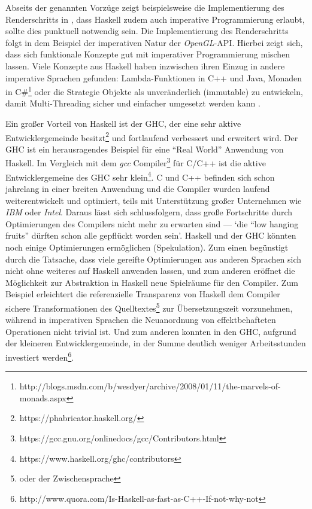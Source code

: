 Abseits der genannten Vorzüge zeigt beispielsweise die Implementierung des Renderschritts in , dass Haskell zudem auch imperative Programmierung erlaubt, sollte dies punktuell notwendig sein. Die Implementierung des Renderschritts folgt in dem Beispiel der imperativen Natur der \textit{OpenGL}-\ac{API}. Hierbei zeigt sich, dass sich funktionale Konzepte gut mit imperativer Programmierung mischen lassen. Viele Konzepte aus Haskell haben inzwischen ihren Einzug in andere imperative Sprachen gefunden: Lambda-Funktionen in C++ und Java, Monaden in C\#\footnote{http://blogs.msdn.com/b/wesdyer/archive/2008/01/11/the-marvels-of-monads.aspx} oder die Strategie Objekte als unveränderlich (immutable) zu entwickeln, damit Multi-Threading sicher und einfacher umgesetzt werden kann \parencite[Seite 46ff]{Peierls:2005:JCP:1076522}.

Ein großer Vorteil von Haskell ist der \ac{GHC}, der eine sehr aktive Entwicklergemeinde besitzt\footnote{https://phabricator.haskell.org/} und fortlaufend verbessert und erweitert wird. Der \ac{GHC} ist ein herausragendes Beispiel für eine "`Real World"' Anwendung von Haskell. Im Vergleich mit dem \textit{gcc} Compiler\footnote{https://gcc.gnu.org/onlinedocs/gcc/Contributors.html} für C/C++ ist die aktive Entwicklergemeine des \ac{GHC} sehr klein\footnote{https://www.haskell.org/ghc/contributors}. C und C++ befinden sich schon jahrelang in einer breiten Anwendung und die Compiler wurden laufend weiterentwickelt und optimiert, teils mit Unterstützung großer Unternehmen wie \textit{IBM} oder \textit{Intel}. Daraus lässt sich schlussfolgern, dass große Fortschritte durch Optimierungen des Compilers nicht mehr zu erwarten sind --- `die "`low hanging fruits"' dürften schon alle gepflückt worden sein'. Haskell und der \ac{GHC} könnten noch einige Optimierungen ermöglichen (Spekulation). Zum einen begünstigt durch die Tatsache, dass viele gereifte Optimierungen aus anderen Sprachen sich nicht ohne weiteres auf Haskell anwenden lassen, und zum anderen eröffnet die Möglichkeit zur Abstraktion in Haskell neue Spielräume für den Compiler. Zum Beispiel erleichtert die referenzielle Transparenz von Haskell dem Compiler sichere Transformationen des Quelltextes\footnote{oder der Zwischensprache} zur Übersetzungszeit vorzunehmen, während in imperativen Sprachen die Neuanordnung von effektbehafteten Operationen nicht trivial ist. Und zum anderen konnten in den \ac{GHC}, aufgrund der kleineren Entwicklergemeinde, in der Summe deutlich weniger Arbeitsstunden investiert werden\footnote{http://www.quora.com/Is-Haskell-as-fast-as-C++-If-not-why-not}.

